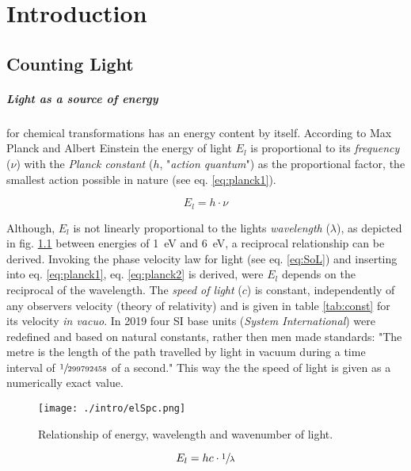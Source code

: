 \chapter{Introduction}
	\section{Counting Light}
	\paragraph{Light as a source of energy} for chemical transformations has an energy content by itself. According to Max Planck and Albert Einstein the energy of light $E_l$ is proportional to its \emph{frequency} ($\nu$) with the \emph{Planck constant} ($h$, "\emph{action quantum}") as the proportional factor, the smallest action possible in nature (see eq. \ref{eq:planck1}). 

	\begin{equation}%
		\label{eq:planck1}
		E_l = h\cdot\nu
	\end{equation}

	Although, $E_l$ is not linearly proportional to the lights \emph{wavelength} ($\lambda$), as depicted in fig. \ref{fig:elSpc} between energies of \qty{1}{\eV} and \qty{6}{\eV}, a reciprocal relationship can be derived. Invoking the phase velocity law for light (see eq. \ref{eq:SoL}) and inserting into eq. \ref{eq:planck1}, eq. \ref{eq:planck2} is derived, were  $E_l$ depends on the reciprocal of the wavelength. The \emph{speed of light} ($c$) is constant, independently of any observers velocity (theory of relativity) and is given in table \ref{tab:const} for its velocity \textit{in vacuo}. In 2019 four SI base units (\textit{System International}) were redefined and based on natural constants, rather then men made standards: "The metre is the length of the path travelled by light in vacuum during a time interval of $\sfrac{1}{299792458}$ of a second." This way the the speed of light is given as a numerically exact value.

	\begin{figure}[h]%
		\centering
		\label{fig:elSpc}
		\texttt{[image: ./intro/elSpc.png]}
		\caption{Relationship of energy, wavelength and wavenumber of light.}
	\end{figure}

	\begin{equation}%
		\label{eq:planck2}
		E_l = hc\cdot\sfrac{1}{\lambda}
	\end{equation}

